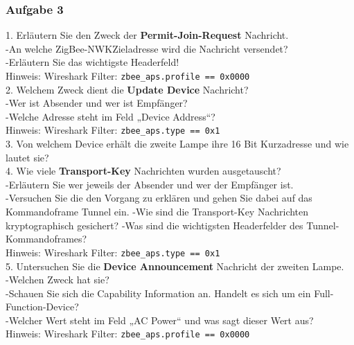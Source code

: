 \subsubsection{Aufgabe 3}
\begin{Fragen}
    1. Erläutern Sie den Zweck der \textbf{Permit-Join-Request} Nachricht.\\ 
    -An welche ZigBee-NWKZieladresse wird die Nachricht versendet?\\ 
    -Erläutern Sie das wichtigste Headerfeld!\\
    Hinweis: Wireshark Filter: \verb|zbee_aps.profile == 0x0000|\\

    2. Welchem Zweck dient die \textbf{Update Device} Nachricht?\\ 
    -Wer ist Absender und wer ist Empfänger? \\
    -Welche Adresse steht im Feld „Device Address“?\\
    Hinweis: Wireshark Filter: \verb|zbee_aps.type == 0x1|\\
    
    3. Von welchem Device erhält die zweite Lampe ihre 16 Bit Kurzadresse und wie lautet sie?\\
    
    4. Wie viele \textbf{Transport-Key} Nachrichten wurden ausgetauscht? \\
    -Erläutern Sie wer jeweils der Absender und wer der Empfänger ist.\\
    -Versuchen Sie die den Vorgang zu erklären und gehen Sie dabei auf das Kommandoframe \grqq Tunnel\grqq{} ein. 
    -Wie sind die Transport-Key Nachrichten kryptographisch gesichert?
    -Was sind die wichtigsten Headerfelder des Tunnel-Kommandoframes?\\
    Hinweis: Wireshark Filter: \verb|zbee_aps.type == 0x1|\\
    
    5. Untersuchen Sie die \textbf{Device Announcement} Nachricht der zweiten Lampe.\\ 
    -Welchen Zweck hat sie? \\
    -Schauen Sie sich die \grqq Capability Information \grqq{} an. Handelt es sich um ein Full-Function-Device?\\ 
    -Welcher Wert steht im Feld „AC Power“ und was sagt dieser Wert aus? \\
    Hinweis: Wireshark Filter: \verb|zbee_aps.profile == 0x0000|\\
    

\end{Fragen}
